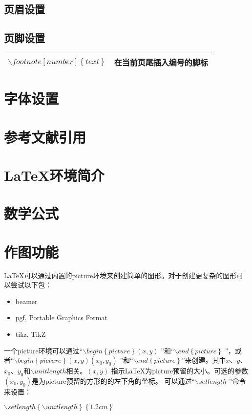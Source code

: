 \documentclass[11pt]{book}
\newcounter{#2}
\newcounter{#2}[#1]
\numberwithin{#2}{#1}
\begin{document}
		\subsection{页眉设置}
		\subsection{页脚设置}
		\begin{tabular}{|l|l|}
			\hline
			$ \backslash footnote[number]\left\lbrace text\right\rbrace $ & 在当前页尾插入编号的脚标 \\
			\hline
		\end{tabular}
		\section{字体设置}

		\section{参考文献引用}
		\section{\LaTeX 环境简介}
		\section{数学公式}
		\section{作图功能}
		\LaTeX 可以通过内置的picture环境来创建简单的图形。对于创建更复杂的图形可以尝试以下包：
		\begin{itemize}
			\item beamer
			\item pgf, Portable Graphics Format
			\item tikz, TikZ
		\end{itemize}
	
		一个picture环境可以通过“$ \backslash begin\left\{picture\right\}(x, y)$ ”和“$ \backslash end\left\{picture\right\}$ ”，或者“$ \backslash begin\left\{picture\right\}(x, y)(x_0, y_0)$ ”和“$ \backslash end\left\{picture\right\}$”来创建。其中$ x $、$ y $、$ x_0 $、$ y_0 $和$ \backslash unitlength $相关。$ (x, y) $ 指示\LaTeX 为picture预留的大小。可选的参数$ (x_0, y_0)$是为picture预留的方形的的左下角的坐标。
		可以通过“$ \backslash setlength$ ”命令来设置：
		\begin{center}
			$ \backslash setlength\left\lbrace \backslash unitlength \right\rbrace \left\lbrace 1.2cm \right\rbrace$
		\end{center}
	
\end{document}
